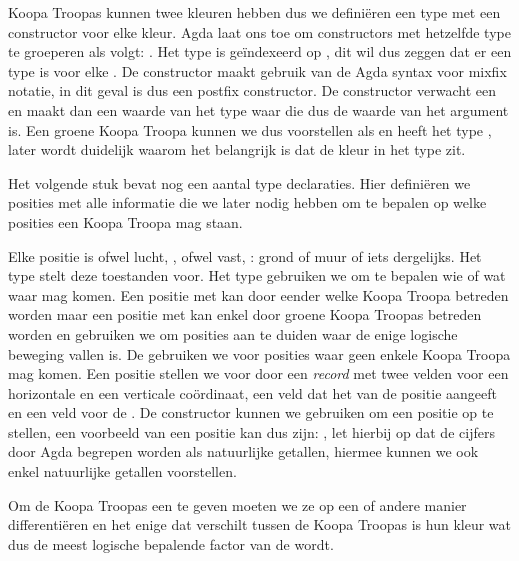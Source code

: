 Koopa Troopas kunnen twee kleuren hebben dus we definiëren een type
 met een constructor voor elke kleur. Agda laat ons toe om
constructors met hetzelfde type te groeperen als volgt: . Het type  is geïndexeerd op , dit wil
dus zeggen dat er een type is voor elke . De constructor maakt
gebruik van de Agda syntax voor mixfix notatie, in dit geval is  dus
een postfix constructor. De  constructor verwacht een 
en maakt dan een waarde van het type  waar die 
dus de waarde van het argument is. Een groene Koopa Troopa kunnen we dus
voorstellen als  en heeft het type ,
later wordt duidelijk waarom het belangrijk is dat de kleur in het type zit.

Het volgende stuk bevat nog een aantal type declaraties. Hier definiëren we
posities met alle informatie die we later nodig hebben om te bepalen op welke
posities een Koopa Troopa mag staan.


Elke positie is ofwel lucht, , ofwel vast, : grond of
muur of iets dergelijks. Het type  stelt deze toestanden voor.
Het type  gebruiken we om te bepalen wie of wat waar mag
komen. Een positie met   kan door eender welke
Koopa Troopa betreden worden maar een positie met 
 kan enkel door groene Koopa Troopas betreden worden en gebruiken
we om posities aan te duiden waar de enige logische beweging vallen is. De
  gebruiken we voor posities waar geen enkele
Koopa Troopa mag komen. Een positie stellen we voor door een \emph{record} met
twee velden voor een horizontale en een verticale coördinaat, een veld dat het
 van de positie aangeeft en een veld voor de .
De constructor  kunnen we gebruiken om een positie op te stellen,
een voorbeeld van een positie kan dus zijn: , let
hierbij op dat de cijfers door Agda begrepen worden als natuurlijke getallen,
hiermee kunnen we ook enkel natuurlijke getallen voorstellen.

Om de Koopa Troopas een  te geven moeten we ze op een of
andere manier differentiëren en het enige dat verschilt tussen de Koopa Troopas
is hun kleur wat dus de meest logische bepalende factor van de
 wordt.

